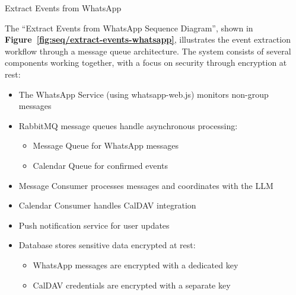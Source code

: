 \begin{usecase}{Extract Events from WhatsApp}
{\begin{itemize}
    \end{itemize}
  }
\end{usecase}

The ``Extract Events from WhatsApp Sequence Diagram'', shown in \textbf{Figure~\ref{fig:seq/extract-events-whatsapp}}, illustrates the event extraction workflow through a message queue architecture. The system consists of several components working together, with a focus on security through encryption at rest:

\begin{itemize}
  \item The WhatsApp Service (using whatsapp-web.js) monitors non-group messages
  \item RabbitMQ message queues handle asynchronous processing:
        \begin{itemize}
          \item Message Queue for WhatsApp messages
          \item Calendar Queue for confirmed events
        \end{itemize}
  \item Message Consumer processes messages and coordinates with the LLM
  \item Calendar Consumer handles CalDAV integration
  \item Push notification service for user updates
  \item Database stores sensitive data encrypted at rest:
        \begin{itemize}
          \item WhatsApp messages are encrypted with a dedicated key
          \item CalDAV credentials are encrypted with a separate key
        \end{itemize}
\end{itemize}

